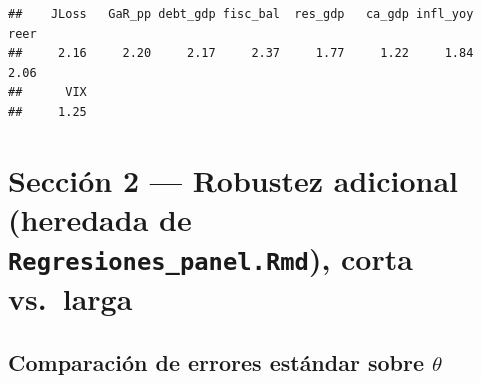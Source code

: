 \documentclass[
]{article}
\newenvironment{Shaded}{\begin{snugshade}}{\end{snugshade}}
\newcommand{\AttributeTok}[1]{\textcolor[rgb]{0.13,0.29,0.53}{#1}}
\newcommand{\ControlFlowTok}[1]{\textcolor[rgb]{0.13,0.29,0.53}{\textbf{#1}}}
\newcommand{\DecValTok}[1]{\textcolor[rgb]{0.00,0.00,0.81}{#1}}
\newcommand{\FunctionTok}[1]{\textcolor[rgb]{0.13,0.29,0.53}{\textbf{#1}}}
\newcommand{\NormalTok}[1]{#1}
\newcommand{\OtherTok}[1]{\textcolor[rgb]{0.56,0.35,0.01}{#1}}
\newcommand{\SpecialCharTok}[1]{\textcolor[rgb]{0.81,0.36,0.00}{\textbf{#1}}}
\newcommand{\StringTok}[1]{\textcolor[rgb]{0.31,0.60,0.02}{#1}}
\begin{document}
\begin{verbatim}
##    JLoss   GaR_pp debt_gdp fisc_bal  res_gdp   ca_gdp infl_yoy     reer 
##     2.16     2.20     2.17     2.37     1.77     1.22     1.84     2.06 
##      VIX 
##     1.25
\end{verbatim}

\section{\texorpdfstring{Sección 2 --- Robustez adicional (heredada de
\texttt{Regresiones\_panel.Rmd}), corta
vs.~larga}{Sección 2 --- Robustez adicional (heredada de Regresiones\_panel.Rmd), corta vs.~larga}}\label{secciuxf3n-2-robustez-adicional-heredada-de-regresiones_panel.rmd-corta-vs.-larga}

\subsection{\texorpdfstring{Comparación de errores estándar sobre
\(\theta\)}{Comparación de errores estándar sobre \textbackslash theta}}\label{comparaciuxf3n-de-errores-estuxe1ndar-sobre-theta}

\begin{Shaded}
\end{Shaded}
\end{document}
